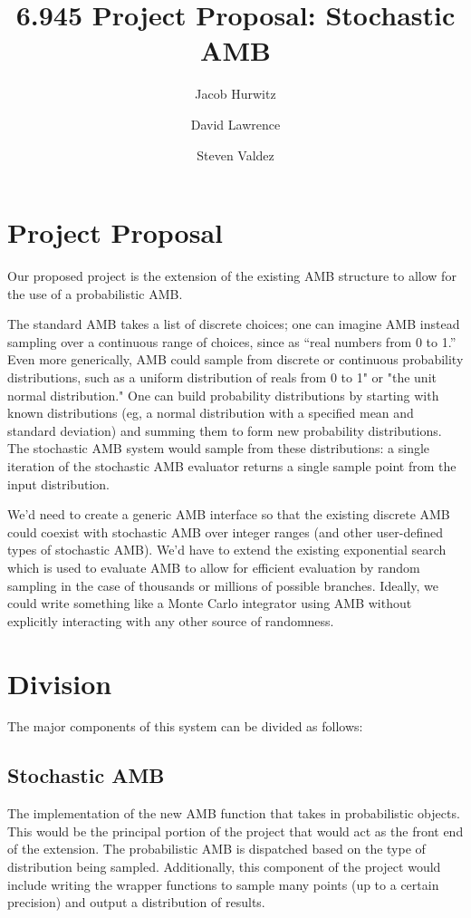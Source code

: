 \documentclass[11pt]{article}
\title{6.945 Project Proposal: Stochastic AMB}
\author{Jacob Hurwitz \and David Lawrence \and Steven Valdez}
\begin{document}
\maketitle

\section{Project Proposal}
Our proposed project is the extension of the existing AMB structure to allow for the use of a probabilistic AMB.

The standard AMB takes a list of discrete choices; one can imagine AMB instead sampling over a continuous range of choices, since as ``real numbers from 0 to 1.'' Even more generically, AMB could sample from discrete or continuous probability distributions, such as a uniform distribution of reals from 0 to 1" or "the unit normal distribution." One can build probability distributions by starting with known distributions (eg, a normal distribution with a specified mean and standard deviation) and summing them to form new probability distributions.  The stochastic AMB system would sample from these distributions: a single iteration of the stochastic AMB evaluator returns a single sample point from the input distribution.

We'd need to create a generic AMB interface so that the existing discrete AMB could coexist with stochastic AMB over integer ranges (and other user-defined types of stochastic AMB).  We'd have to extend the existing exponential search which is used to evaluate AMB to allow for efficient evaluation by random sampling in the case of thousands or millions of possible branches.  Ideally, we could write something like a Monte Carlo integrator using AMB without explicitly interacting with any other source of randomness.

\section{Division}
The major components of this system can be divided as follows:

\subsection{Stochastic AMB}
The implementation of the new AMB function that takes in probabilistic objects. This would be the principal portion of the project that would act as the front end of the extension. The probabilistic AMB is dispatched based on the type of distribution being sampled. Additionally, this component of the project would include writing the wrapper functions to sample many points (up to a certain precision) and output a distribution of results.
\end{document}
